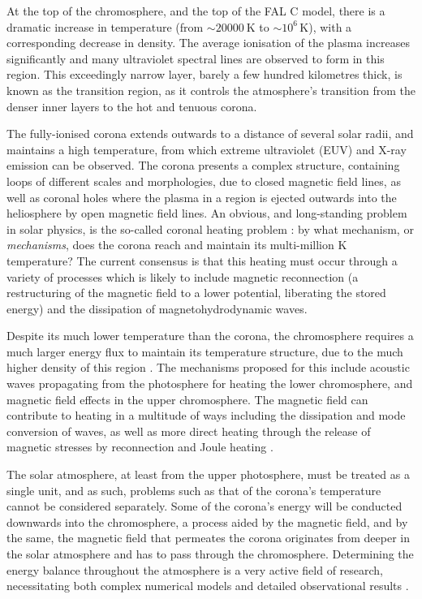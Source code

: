 At the top of the chromosphere, and the top of the FAL C model, there is a dramatic increase in temperature (from $\sim\SI{20 000}{\kelvin}$ to $\sim 10^6\,\si{\kelvin}$), with a corresponding decrease in density.
The average ionisation of the plasma increases significantly and many ultraviolet spectral lines are observed to form in this region.
This exceedingly narrow layer, barely a few hundred kilometres thick, is known as the transition region, as it controls the atmosphere's transition from the denser inner layers to the hot and tenuous corona.

The fully-ionised corona extends outwards to a distance of several solar radii, and maintains a high temperature, from which extreme ultraviolet (EUV) and X-ray emission can be observed.
The corona presents a complex structure, containing loops of different scales and morphologies, due to closed magnetic field lines, as well as coronal holes where the plasma in a region is ejected outwards into the heliosphere by open magnetic field lines.
An obvious, and long-standing problem in solar physics, is the so-called coronal heating problem \citep[reviewed by ][]{Klimchuk2006}: by what mechanism, or \emph{mechanisms}, does the corona reach and maintain its multi-million \si{\kelvin} temperature?
The current consensus \citep[][ and references therein]{DeMoortel2015} is that this heating must occur through a variety of processes which is likely to include magnetic reconnection (a restructuring of the magnetic field to a lower potential, liberating the stored energy) and the dissipation of magnetohydrodynamic waves.

Despite its much lower temperature than the corona, the chromosphere requires a much larger energy flux to maintain its temperature structure, due to the much higher density of this region \citep{DeMoortel2015,Carlsson2019}.
The mechanisms proposed for this include acoustic waves propagating from the photosphere for heating the lower chromosphere, and magnetic field effects in the upper chromosphere.
The magnetic field can contribute to heating in a multitude of ways including the dissipation and mode conversion of waves, as well as more direct heating through the release of magnetic stresses by reconnection and Joule heating \citep{Carlsson2019}.

The solar atmosphere, at least from the upper photosphere, must be treated as a single unit, and as such, problems such as that of the corona's temperature cannot be considered separately.
Some of the corona's energy will be conducted downwards into the chromosphere, a process aided by the magnetic field, and by the same, the magnetic field that permeates the corona originates from deeper in the solar atmosphere and has to pass through the chromosphere.
Determining the energy balance throughout the atmosphere is a very active field of research, necessitating both complex numerical models and detailed observational results \citep[e.g.][]{Carlsson2019}.

